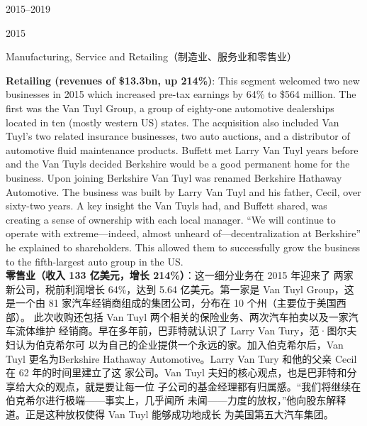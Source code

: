 \begin{chapter}{2015--2019}
\begin{section}{2015}
\begin{subsection}{Manufacturing, Service and Retailing（制造业、服务业和零售业）}
\begin{verseparallel}
{    \textbf{Retailing (revenues of \$13.3bn, up 214\%)}: This segment welcomed
    two new businesses in 2015 which increased pre-tax earnings by 64\% to \$564
    million. The first was the Van Tuyl Group, a group of eighty-one automotive
    dealerships located in ten (mostly western US) states. The acquisition also
    included Van Tuyl’s two related insurance businesses, two auto auctions,
    and a distributor of automotive fluid maintenance products. Buffett met
    Larry Van Tuyl years before and the Van Tuyls decided Berkshire would be a
    good permanent home for the business. Upon joining Berkshire Van Tuyl was
    renamed Berkshire Hathaway Automotive. The business was built by Larry Van
    Tuyl and his father, Cecil, over sixty-two years. A key insight the Van
    Tuyls had, and Buffett shared, was creating a sense of ownership with each
    local manager. ``We will continue to operate with extreme—indeed, almost
    unheard of—decentralization at Berkshire'' he explained to shareholders.
    This allowed them to successfully grow the business to the fifth-largest
    auto group in the US\@.  \\

  }
  {
    \textbf{零售业（收入 133 亿美元，增长 214\%）}：这一细分业务在 2015 年迎来了
    两家新公司，税前利润增长 64\%，达到 5.64 亿美元。第一家是 Van Tuyl Group，这
    是一个由 81 家汽车经销商组成的集团公司，分布在 10 个州（主要位于美国西部）。
    此次收购还包括 Van Tuyl 两个相关的保险业务、两次汽车拍卖以及一家汽车流体维护
    经销商。早在多年前，巴菲特就认识了 Larry Van Tury，范·图尔夫妇认为伯克希尔可
    以为自己的企业提供一个永远的家。加入伯克希尔后，Van Tuyl 更名为Berkshire
    Hathaway Automotive。Larry Van Tury 和他的父亲 Cecil 在 62 年的时间里建立了这
    家公司。Van Tuyl 夫妇的核心观点，也是巴菲特和分享给大众的观点，就是要让每一位
    子公司的基金经理都有归属感。“我们将继续在伯克希尔进行极端——事实上，几乎闻所
    未闻——力度的放权，”他向股东解释道。正是这种放权使得 Van Tuyl 能够成功地成长
    为美国第五大汽车集团。
  }
\end{verseparallel}


\end{subsection}
\end{section}
\end{chapter}
